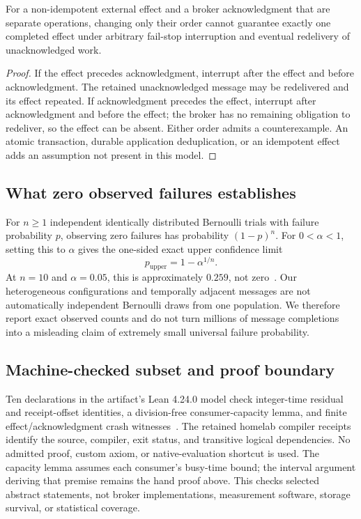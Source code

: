 \begin{proposition}\label{prop:effects}
For a non-idempotent external effect and a broker acknowledgment that are separate operations, changing only their order cannot guarantee exactly one completed effect under arbitrary fail-stop interruption and eventual redelivery of unacknowledged work.
\end{proposition}
\begin{proof}
If the effect precedes acknowledgment, interrupt after the effect and before acknowledgment. The retained unacknowledged message may be redelivered and its effect repeated. If acknowledgment precedes the effect, interrupt after acknowledgment and before the effect; the broker has no remaining obligation to redeliver, so the effect can be absent. Either order admits a counterexample. An atomic transaction, durable application deduplication, or an idempotent effect adds an assumption not present in this model.
\end{proof}

\subsection{What zero observed failures establishes}

For $n\geq1$ independent identically distributed Bernoulli trials with failure probability $p$, observing zero failures has probability $(1-p)^n$. For $0<\alpha<1$, setting this to $\alpha$ gives the one-sided exact upper confidence limit
\[
p_\mathrm{upper}=1-\alpha^{1/n}.
\]
At $n=10$ and $\alpha=0.05$, this is approximately $0.259$, not zero~\cite{clopper1934}. Our heterogeneous configurations and temporally adjacent messages are not automatically independent Bernoulli draws from one population. We therefore report exact observed counts and do not turn millions of message completions into a misleading claim of extremely small universal failure probability.

\subsection{Machine-checked subset and proof boundary}\label{sec:lean}

Ten declarations in the artifact's Lean 4.24.0 model check integer-time residual and receipt-offset identities, a division-free consumer-capacity lemma, and finite effect/acknowledgment crash witnesses~\cite{demoura2021lean4,lean424release}. The retained homelab compiler receipts identify the source, compiler, exit status, and transitive logical dependencies. No admitted proof, custom axiom, or native-evaluation shortcut is used. The capacity lemma assumes each consumer's busy-time bound; the interval argument deriving that premise remains the hand proof above. This checks selected abstract statements, not broker implementations, measurement software, storage survival, or statistical coverage.
